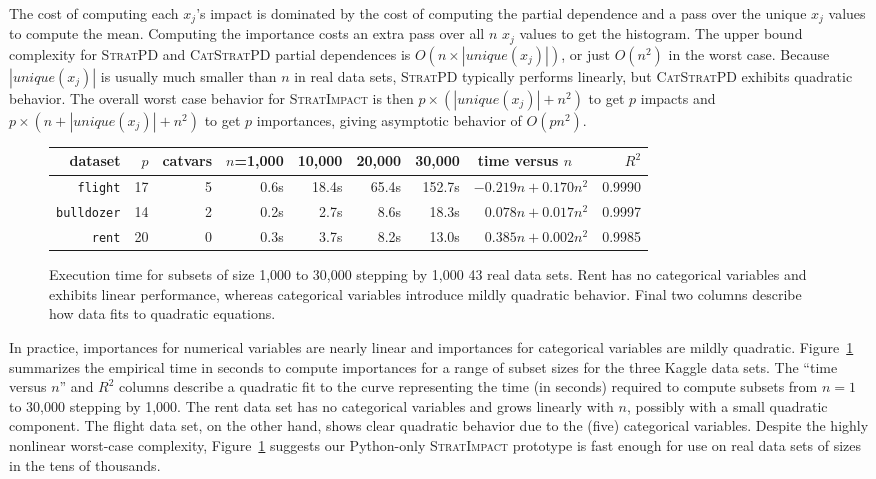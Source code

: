 \documentclass[11pt]{article}
\newcommand{\figref}[1]{Figure~\ref{#1}}
\newcommand{\simp}{\fontfamily{cmr}\textsc{\small StratImpact}}
\newcommand{\spd}{\fontfamily{cmr}\textsc{\small StratPD}}
\newcommand{\cspd}{\fontfamily{cmr}\textsc{\small CatStratPD}}
\begin{document}
The cost of computing each $x_j$'s impact is dominated by the cost of computing the partial dependence and a pass over the unique $x_j$ values to compute the mean. Computing the importance costs an extra pass over all $n$ $x_j$ values to get the histogram. The upper bound  complexity for \spd{} and \cspd{} partial dependences is $O(n \times |unique(x_j)|)$, or just $O(n^2)$ in the worst case.   Because $|unique(x_j)|$ is usually much smaller than $n$ in real data sets, \spd{} typically performs linearly, but \cspd{} exhibits quadratic behavior.  The overall worst case behavior for \simp{} is then $p \times (|unique(x_j)| + n^2)$ to get $p$ impacts and $p \times (n + |unique(x_j)| + n^2)$  to get $p$ importances, giving asymptotic behavior of $O(pn^2)$.

\begin{figure}
\centering
\begin{tabular}{r r r r r r r r r}
{\bf dataset} & $p$ & catvars & {\small $n$=1,000} & {\small 10,000} & {\small 20,000} & {\small 30,000} & time versus $n$~~ & $R^2$\\
\hline
{\tt\small flight} & 17 & 5 & 0.6s & 18.4s & 65.4s & 152.7s & {\small $-0.219 n + 0.170 n^2$} & {\small 0.9990}\\
{\tt\small bulldozer} & 14 & 2 & 0.2s & 2.7s & 8.6s & 18.3s & {\small $0.078 n + 0.017 n^2$} & {\small 0.9997}\\
{\tt\small rent} & 20 & 0 & 0.3s & 3.7s & 8.2s & 13.0s & {\small $0.385 n + 0.002 n^2$} & {\small 0.9985}\\
\end{tabular}
\caption{\small  Execution time for subsets of size 1,000 to 30,000 stepping by 1,000 43 real data sets. Rent has no categorical variables and exhibits linear performance, whereas categorical variables introduce mildly quadratic behavior. Final two columns describe how data fits to quadratic equations.}
\label{fig:timing}
\end{figure}

In practice, importances for numerical variables are nearly linear and importances for categorical variables are mildly quadratic. \figref{fig:timing} summarizes the empirical time in seconds to compute importances for a range of subset sizes for the three Kaggle data sets. The ``time versus $n$'' and $R^2$ columns describe a quadratic fit to the curve representing the time (in seconds) required to compute subsets from $n=1$ to 30,000 stepping by 1,000. The rent data set has no categorical variables and grows linearly with $n$, possibly with a small quadratic component. The flight data set, on the other hand, shows clear quadratic behavior due to the (five) categorical variables. Despite the highly nonlinear worst-case complexity, \figref{fig:timing} suggests our Python-only \simp{} prototype is fast enough for use on real data sets of sizes in the tens of thousands. 
\end{document}
